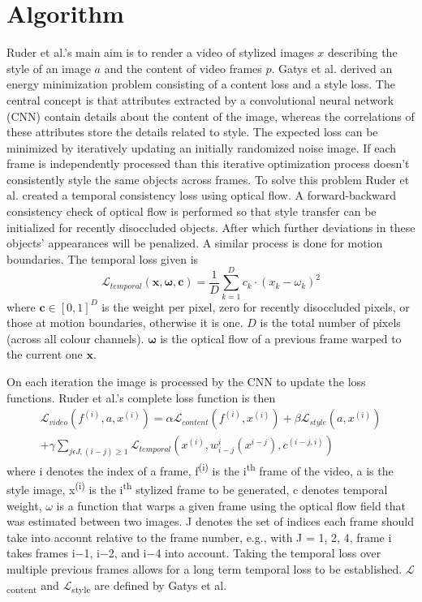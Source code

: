 \documentclass[runningheads]{llncs}
\begin{document}
\section{Algorithm}
Ruder et al.'s \cite{10.1007/978-3-319-45886-1_3} main aim is to render a video of stylized images $x$ describing the style of an image $a$ and the content of  video frames $p$. Gatys et al. \cite{gatys2016image} derived an energy minimization problem consisting of a content loss and a style loss. The central concept is that attributes extracted by a convolutional neural network (CNN) contain details about the content of the image, whereas the correlations of these attributes store the details related to style. The expected loss can be minimized by iteratively updating an initially randomized noise image. If each frame is independently processed than this iterative optimization process doesn't consistently style the same objects across frames. To solve this problem Ruder et al. \cite{10.1007/978-3-319-45886-1_3}  created a temporal consistency loss using optical flow. A forward-backward consistency check of optical flow is performed so that style transfer can be initialized for recently disoccluded objects. After which further deviations in these objects' appearances will be penalized. A similar process is done for motion boundaries. The temporal loss given is 
\begin{equation}
	\mathcal{L}_{temporal} (\bm{x}, \bm{\omega}, \bm{c}) = \frac{1}{D} \sum_{k=1}^{D} c_k \cdot (x_k - \omega_k)^2
\end{equation} 
where $\bm{c} \in [0, 1]^D$ is the weight per pixel, zero for recently disoccluded pixels, or those at motion boundaries, otherwise it is one. $D$ is the total number of pixels (across all colour channels). $\bm{\omega}$ is the optical flow of a previous frame warped to the current one $\bm{x}$.

On each iteration the image is processed by the CNN to update the loss functions. Ruder et al.'s complete loss function is then
\begin{equation}
\begin{split}
\mathcal{L}_{video}(f^{(i)} ,a,x^{(i)}) = \alpha \mathcal{L}_{content}(f^{(i)},x^{(i)})
+ \beta \mathcal{L}_{style}(a,x^{(i)})\\+  \gamma \sum_{j \epsilon J, (i-j) \geq 1} \mathcal{L}_{temporal}(x^{(i)}, w_{i-j}^{i}(x^{i-j}),c^{(i-j, i)})
\end{split}
\end{equation}
where i denotes the index of a frame, f\textsuperscript{(i)} is the i\textsuperscript{th} frame of the video, a is the style image, x\textsuperscript{(i)} is the i\textsuperscript{th} stylized frame to be generated, c denotes temporal weight, $\omega$ is a function that warps a given frame using the optical flow field that was estimated between two images. J denotes the set of indices each frame should take into account relative to the frame number, e.g., with J = {1, 2, 4}, frame i takes frames i$-$1, i$-$2, and i$-$4
into account. Taking the temporal loss over multiple previous frames allows for a long term temporal loss to be established. $\mathcal{L}$\textsubscript{content} and $\mathcal{L}$\textsubscript{style} are defined by Gatys et al. \cite{gatys2016image}
\end{document}
